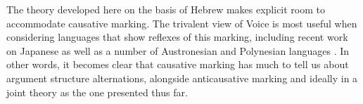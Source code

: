 The theory developed here on the basis of Hebrew makes explicit room to accommodate causative marking. The trivalent view of Voice is most useful when considering languages that show reflexes of this marking, including recent work on Japanese \citep{oseki17nyu} as well as a number of Austronesian and Polynesian languages \citep{nie17}. In other words, it becomes clear that causative marking has much to tell us about argument structure alternations, alongside anticausative marking and ideally in a joint theory as the one presented thus far.

%
%
%	

